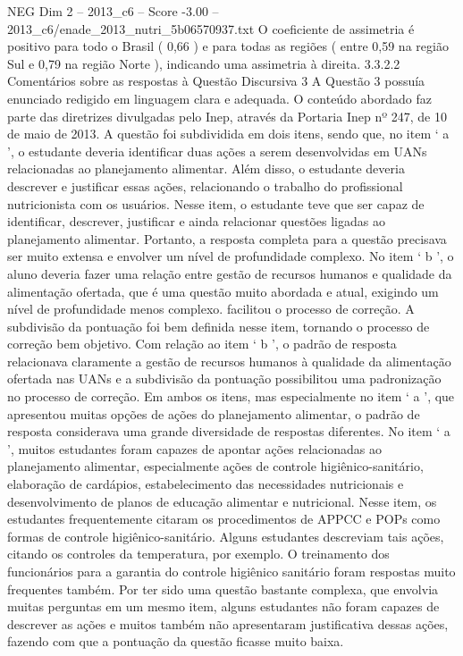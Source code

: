 \begin{textsample}{NEG Dim 2 – 2013\_c6 – Score -3.00 – 2013\_c6/enade\_2013\_nutri\_5b06570937.txt}
O coeficiente de assimetria é positivo para todo o Brasil ( 0,66 ) e para todas as regiões ( entre 0,59 na região Sul e 0,79 na região Norte ), indicando uma assimetria à direita. 3.3.2.2 Comentários sobre as respostas à Questão Discursiva 3 A Questão 3 possuía enunciado redigido em linguagem clara e adequada.
O conteúdo abordado faz parte das diretrizes divulgadas pelo Inep, através da Portaria Inep nº 247, de 10 de maio de 2013.
A questão foi subdividida em dois itens, sendo que, no item ‘ a ’, o estudante deveria identificar duas ações a serem desenvolvidas em UANs relacionadas ao planejamento alimentar.
Além disso, o estudante deveria descrever e justificar essas ações, relacionando o trabalho do profissional nutricionista com os usuários.
Nesse item, o estudante teve que ser capaz de identificar, descrever, justificar e ainda relacionar questões ligadas ao planejamento alimentar.
Portanto, a resposta completa para a questão precisava ser muito extensa e envolver um nível de profundidade complexo.
No item ‘ b ’, o aluno deveria fazer uma relação entre gestão de recursos humanos e qualidade da alimentação ofertada, que é uma questão muito abordada e atual, exigindo um nível de profundidade menos complexo. facilitou o processo de correção.
A subdivisão da pontuação foi bem definida nesse item, tornando o processo de correção bem objetivo.
Com relação ao item ‘ b ’, o padrão de resposta relacionava claramente a gestão de recursos humanos à qualidade da alimentação ofertada nas UANs e a subdivisão da pontuação possibilitou uma padronização no processo de correção.
Em ambos os itens, mas especialmente no item ‘ a ’, que apresentou muitas opções de ações do planejamento alimentar, o padrão de resposta considerava uma grande diversidade de respostas diferentes.
No item ‘ a ’, muitos estudantes foram capazes de apontar ações relacionadas ao planejamento alimentar, especialmente ações de controle higiênico-sanitário, elaboração de cardápios, estabelecimento das necessidades nutricionais e desenvolvimento de planos de educação alimentar e nutricional.
Nesse item, os estudantes frequentemente citaram os procedimentos de APPCC e POPs como formas de controle higiênico-sanitário.
Alguns estudantes descreviam tais ações, citando os controles da temperatura, por exemplo.
O treinamento dos funcionários para a garantia do controle higiênico sanitário foram respostas muito frequentes também.
Por ter sido uma questão bastante complexa, que envolvia muitas perguntas em um mesmo item, alguns estudantes não foram capazes de descrever as ações e muitos também não apresentaram justificativa dessas ações, fazendo com que a pontuação da questão ficasse muito baixa.

\end{textsample}
